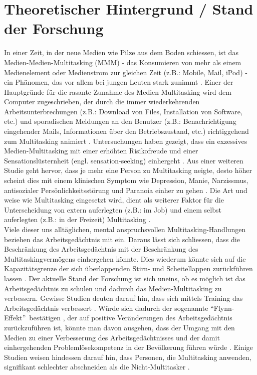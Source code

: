 \section*{Theoretischer Hintergrund / Stand der Forschung}\label{section.forschung}
In einer Zeit, in der neue Medien wie Pilze aus dem Boden schiessen, ist das Medien-Medien-Multitasking (MMM) - das Konsumieren von mehr als einem Medienelement oder Medienstrom zur gleichen Zeit (z.B.: Mobile, Mail, iPod) - ein Phänomen, das vor allem bei jungen Leuten stark zunimmt \cite{Rideout2010}. Einer der Hauptgründe für die rasante Zunahme des Medien-Multitasking wird dem Computer zugeschrieben, der durch die immer wiederkehrenden Arbeitsunterbrechungen (z.B.: Download von Files, Installation von Software, etc.) und sporadischen Meldungen an den Benutzer (z.B.: Benachrichtigung eingehender Mails, Informationen über den Betriebszustand, etc.) richtiggehend zum Multitasking animiert \cite{Foehr2006}.  Untersuchungen haben gezeigt, dass ein exzessives Medien-Multitasking mit einer erhöhten Risikofreude und einer Sensationslüsternheit (engl. sensation-seeking) einhergeht \cite{Foehr2006}. Aus einer weiteren Studie geht hervor, dass je mehr eine Person zu Multitasking neigte, desto höher scheint dies mit einem klinischen Symptom wie Depression, Manie, Narzissmus, antisozialer Persönlichkeitsstörung und Paranoia einher zu gehen \cite{Rosen2013}. Die Art und weise wie Multitasking eingesetzt wird, dient als weiterer Faktor für die Unterscheidung von extern auferlegten (z.B.: im Job) und einem selbst auferlegten (z.B.: in der Freizeit) Multitasking \cite{Shih2013}. \\
Viele dieser uns alltäglichen, mental anspruchsvollen Multitasking-Handlungen beziehen das Arbeitsgedächtnis mit ein. Daraus lässt sich schliessen, dass die Beschränkung des Arbeitsgedächtnis mit der Beschränkung des Multitaskingvermögens einhergehen könnte. Dies wiederum könnte sich auf die Kapazitätsgrenze der sich überlappenden Stirn- und Scheitellappen zurückführen lassen \cite{Klingberg2008}. Der aktuelle Stand der Forschung ist sich uneins, ob es möglich ist das Arbeitsgedächtnis zu schulen und dadurch das Medien-Multitasking zu verbessern. Gewisse Studien deuten darauf hin, dass sich mittels Training das Arbeitsgedächtnis verbessert \cite{Hernstein1986, Feuerstein1985, Stankov1986}. Würde sich dadurch der sogenannte \textquotedblleft Flynn-Effekt\textquotedblright \ bestätigen \cite{Flynn1987}, der auf positive Veränderungen des Arbeitsgedächtnis zurückzuführen ist, könnte man davon ausgehen, dass der Umgang mit den Medien zu einer Verbesserung des Arbeitsgedächtnisses und der damit einhergehenden Problemlösekompetenz in der Bevölkerung führen würde \cite{Klingberg2008}. Einige Studien weisen hindessen darauf hin, dass Personen, die Multitasking anwenden, signifikant schlechter abschneiden als die Nicht-Multitasker \cite{Spitzer2012}.\\
